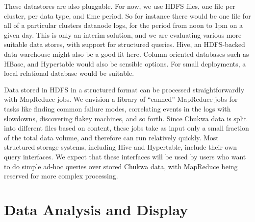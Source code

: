 \documentclass[letterpaper,twocolumn,10pt]{article}
\begin{document}

 These datastores are also pluggable. For now, we use HDFS files, one file per cluster, per data type, and time period.  So for instance there would be one file for all of a particular clusters datanode logs, for the period from noon to 1pm on a given day.   This is only an interim solution, and we are evaluating various more suitable data stores, with support for structured queries.  Hive, an HDFS-backed data warehouse might also be a good fit here. \cite{hive} 
 Column-oriented databases such as HBase, and Hypertable would also be sensible options.  For small deployments, a local relational database would be suitable.


Data stored in HDFS in a structured format can be processed straightforwardly with MapReduce jobs. We envision a library of ``canned'' MapReduce jobs for tasks like finding common failure modes, correlating events in the logs with slowdowns, discovering flakey machines, and so forth.  Since Chukwa data is split into different files based on content, these jobs take as input only a small fraction of the total data volume, and therefore can run relatively quickly.  Most structured storage systems, including Hive and Hypertable, include their own query interfaces. We expect that these interfaces will be used by users who want to do simple ad-hoc queries over stored Chukwa data, with MapReduce being reserved for more complex processing.

\section{Data Analysis and Display}
\end{document}
